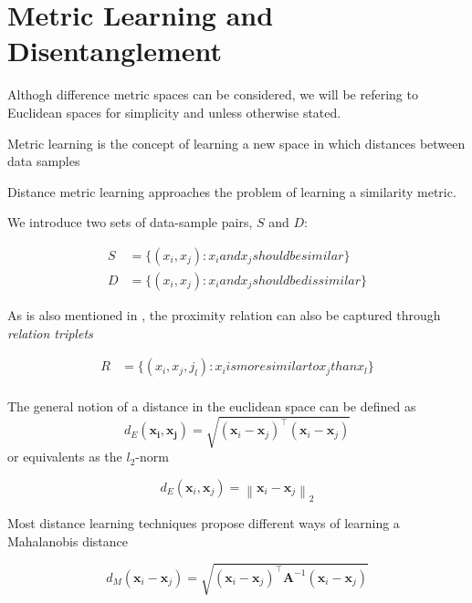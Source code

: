 \documentclass[a4paper,12pt,twoside,openright]{report}
\begin{document}
\section{Metric Learning and Disentanglement}

Althogh difference metric spaces can be considered, we will be refering to Euclidean spaces for simplicity and unless otherwise stated.

Metric learning is the concept of learning a new space in which distances between data samples 

Distance metric learning approaches the problem of learning a similarity metric.

We introduce two sets of data-sample pairs, $S$ and $D$:

\begin{align}
S &= \{ (x_i, x_j) : x_i and x_j should be similar\} \\
D &= \{ (x_i, x_j) : x_i and x_j should be dissimilar\}
\end{align}

As is also mentioned in \cite{moutafis17}, the proximity relation can also be captured through \textit{relation triplets}

\begin{align}
R &= \{ (x_i, x_j, j_l) : x_i is more similar to x_j than x_l \} \\
\end{align}

The general notion of a distance in the euclidean space can be defined as 
\begin{equation}
d_{E}\left(\boldsymbol{x}_{\boldsymbol{i}}, \boldsymbol{x}_{\boldsymbol{j}}\right)=\sqrt{\left(\boldsymbol{x}_{i}-\boldsymbol{x}_{j}\right)^{\top}\left(\boldsymbol{x}_{i}-\boldsymbol{x}_{j}\right)}
\end{equation}
or equivalents as the $l_2$-norm

\begin{equation}
d_{E}\left(\boldsymbol{x}_{i}, \boldsymbol{x}_{j}\right)=\left\|\boldsymbol{x}_{i}-\boldsymbol{x}_{j}\right\|_{2}
\end{equation}

Most distance learning techniques propose different ways of learning a Mahalanobis distance \cite{mahalanobis36}

\begin{equation}
d_{M}\left(\boldsymbol{x}_{i}-\boldsymbol{x}_{j}\right)=\sqrt{\left(\boldsymbol{x}_{i}-\boldsymbol{x}_{j}\right)^{\top} \boldsymbol{A}^{-1}\left(\boldsymbol{x}_{i}-\boldsymbol{x}_{j}\right)}
\end{equation}
\end{document}
